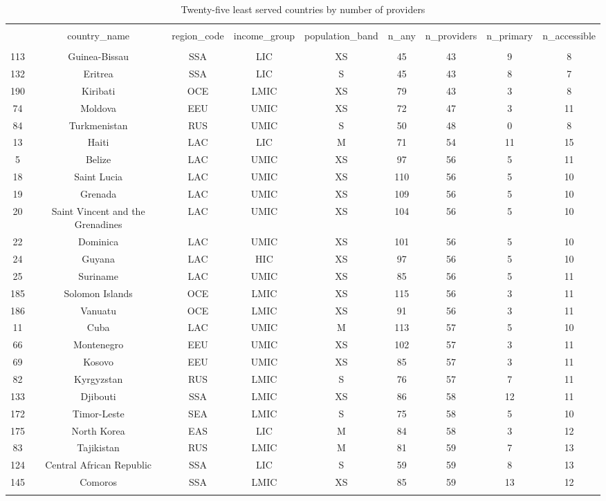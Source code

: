 
\begin{table}[!htbp] \centering 
  \caption{Twenty-five least served countries by number of providers} 
  \label{} 
\begin{tabular}{@{\extracolsep{5pt}} ccccccccc} 
\\[-1.8ex]\hline 
\hline \\[-1.8ex] 
 & country\_name & region\_code & income\_group & population\_band & n\_any & n\_providers & n\_primary & n\_accessible \\ 
\hline \\[-1.8ex] 
113 & Guinea-Bissau & SSA & LIC & XS &  45 & 43 &  9 &  8 \\ 
132 & Eritrea & SSA & LIC & S &  45 & 43 &  8 &  7 \\ 
190 & Kiribati & OCE & LMIC & XS &  79 & 43 &  3 &  8 \\ 
74 & Moldova & EEU & UMIC & XS &  72 & 47 &  3 & 11 \\ 
84 & Turkmenistan & RUS & UMIC & S &  50 & 48 &  0 &  8 \\ 
13 & Haiti & LAC & LIC & M &  71 & 54 & 11 & 15 \\ 
5 & Belize & LAC & UMIC & XS &  97 & 56 &  5 & 11 \\ 
18 & Saint Lucia & LAC & UMIC & XS & 110 & 56 &  5 & 10 \\ 
19 & Grenada & LAC & UMIC & XS & 109 & 56 &  5 & 10 \\ 
20 & Saint Vincent and the Grenadines & LAC & UMIC & XS & 104 & 56 &  5 & 10 \\ 
22 & Dominica & LAC & UMIC & XS & 101 & 56 &  5 & 10 \\ 
24 & Guyana & LAC & HIC & XS &  97 & 56 &  5 & 10 \\ 
25 & Suriname & LAC & UMIC & XS &  85 & 56 &  5 & 11 \\ 
185 & Solomon Islands & OCE & LMIC & XS & 115 & 56 &  3 & 11 \\ 
186 & Vanuatu & OCE & LMIC & XS &  91 & 56 &  3 & 11 \\ 
11 & Cuba & LAC & UMIC & M & 113 & 57 &  5 & 10 \\ 
66 & Montenegro & EEU & UMIC & XS & 102 & 57 &  3 & 11 \\ 
69 & Kosovo & EEU & UMIC & XS &  85 & 57 &  3 & 11 \\ 
82 & Kyrgyzstan & RUS & LMIC & S &  76 & 57 &  7 & 11 \\ 
133 & Djibouti & SSA & LMIC & XS &  86 & 58 & 12 & 11 \\ 
172 & Timor-Leste & SEA & LMIC & S &  75 & 58 &  5 & 10 \\ 
175 & North Korea & EAS & LIC & M &  84 & 58 &  3 & 12 \\ 
83 & Tajikistan & RUS & LMIC & M &  81 & 59 &  7 & 13 \\ 
124 & Central African Republic & SSA & LIC & S &  59 & 59 &  8 & 13 \\ 
145 & Comoros & SSA & LMIC & XS &  85 & 59 & 13 & 12 \\ 
\hline \\[-1.8ex] 
\end{tabular} 
\end{table} 
